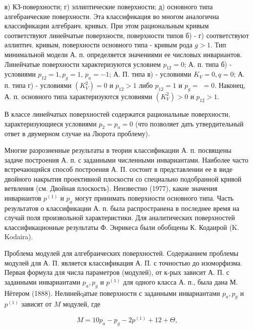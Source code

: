 \documentclass[10pt]{article}
\begin{document}
в) КЗ-поверхности; г) эллиптические поверхности; д) основного типа алгебраические поверхности. Эта классификация во многом аналогична классификации алгебраич. кривых. При этом рациональным кривым соответствуют линейчатые поверхности, поверхности типов б) - г) соответствуют әллиптич. кривым, поверхности основного типа - кривым рода $g>1$. Тип минимальной модели А. п. определяется значениями ее числовых инвариантов. Линейчатые поверхности характеризуются условием $p_{12}=0$; А. п. типа б) - условиями $p_{12}=1, p_{g}=1$, $p_{a}=-1$; А. П. типа в) - условиями $K_{V}=0, q=0$; А. п. типа г) - условиями $\left(K_{V}^{2}\right)=0$ и $p_{12}>1$ либо $p_{12}=1$ и $p_{g}=$ $=0$. Наконец, А. п. основного типа характеризуются условиями $\left(K_{V}^{2}\right)>0$ и $p_{12}>1$.



В классе линейчатых поверхностей содержатся рациональные поверхности, характеризующиеся условиями $p_{2}=p_{a}=0$ (что позволяет дать утвердительный ответ в двумерном случае на Люрота проблему).



Многие разрозненные результаты в теории классификации А. п. посвящены задаче построения А. п. с заданными численными инвариантами. Наиболее часто встречающийся способ построения А. П. состоит в представлении ее в виде двойного накрытия проективной плоскости со специально подобранной кривой ветвления (см. Двойная плоскость). Неизвестно (1977), какие значения инвариантов $p^{(1)}$ и $p_{a}$ могут принимать поверхности основного типа. Часть результатов о классификации А. п. была распространена в последнее время на случай поля произвольной характеристики. Для аналитических поверхностей классификационные результаты Ф. Энрикеса были обобщены К. Кодаирой (K. Kodaira).



Проблема модулей для алгебраических поверхностей. Содержанием проблемы модулей для А. П. является классификация А. П. с точностью до изоморфизма. Первая формула для числа параметров (модулей), от к-рых зависит А. П. с заданными инвариантами $p_{a}, p_{g}$ и $p^{(1)}$ для одного класса А. п., была дана М. Нётером (1888). Нелинейqатые поверхности с заданными инвариантами $p_{a}, p_{g}$ и $p^{(1)}$ зависят от $M$ модулей, где



\[

M=10 p_{a}-p_{g}-2 p^{(1)}+12+\Theta,

\]
\end{document}
